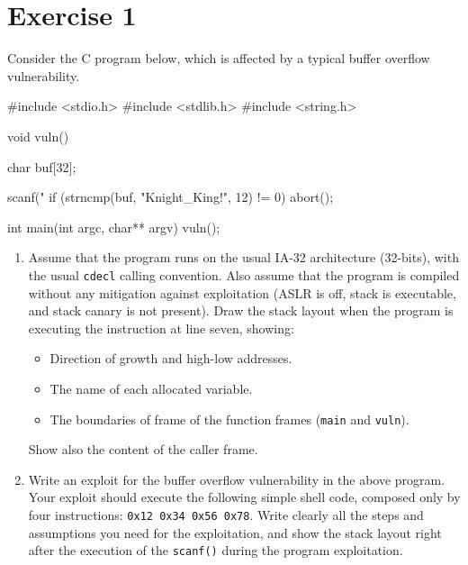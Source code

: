 \section{Exercise 1}

Consider the C program below, which is affected by a typical buffer overflow vulnerability.
\begin{verbnobox}[\verbarg]
#include <stdio.h>
#include <stdlib.h>
#include <string.h>

void vuln() {
    char buf[32];

    scanf("%
    if (strncmp(buf, "Knight_King!", 12) != 0) {
        abort();
    }
}

int main(int argc, char** argv) {
    vuln();
}
\end{verbnobox}
\begin{enumerate}
    \item Assume that the program runs on the usual IA-32 architecture (32-bits), with the usual \texttt{cdecl} calling convention. 
        Also assume that the program is compiled without any mitigation against exploitation (ASLR is off, stack is executable, and stack canary is not present).
        Draw the stack layout when the program is executing the instruction at line seven, showing:
        \begin{itemize}
            \item Direction of growth and high-low addresses.
            \item The name of each allocated variable.
            \item The boundaries of frame of the function frames (\texttt{main} and \texttt{vuln}).
        \end{itemize}
        Show also the content of the caller frame.
    \item Write an exploit for the buffer overflow vulnerability in the above program. 
        Your exploit should execute the following simple shell code, composed only by four instructions: \texttt{0x12 0x34 0x56 0x78}.
        Write clearly all the steps and assumptions you need for the exploitation, and show the stack layout right after the execution of the \texttt{scanf()} during the program exploitation.
\end{enumerate}

